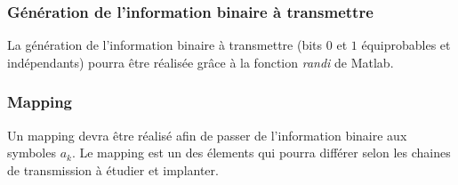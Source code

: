 \documentclass{article}
\begin{document}
\subsubsection{Génération de l'information binaire à transmettre}
La génération de l'information binaire à transmettre (bits $0$ et $1$ équiprobables et indépendants) pourra être réalisée grâce à la fonction \emph{randi} de Matlab.
%


\subsubsection{Mapping}
Un mapping devra être réalisé afin de passer de l'information binaire aux symboles $a_k$. Le mapping est un des élements qui pourra différer selon les chaines de transmission à étudier et implanter.
\end{document}
